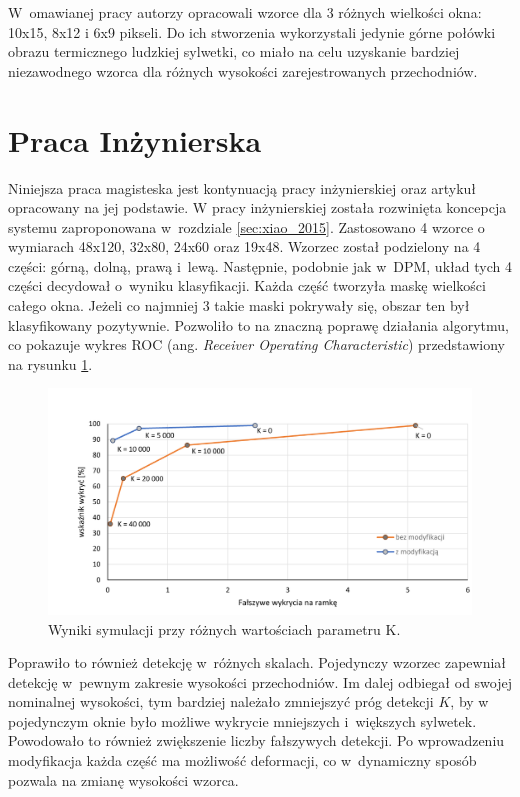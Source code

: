 W~omawianej pracy autorzy opracowali wzorce dla 3 różnych wielkości okna: 10x15, 8x12 i 6x9 pikseli. 
Do ich stworzenia wykorzystali jedynie górne połówki obrazu termicznego ludzkiej sylwetki, co miało na celu uzyskanie bardziej niezawodnego wzorca dla różnych wysokości zarejestrowanych przechodniów.

\section{Praca Inżynierska}

Niniejsza praca magisteska jest kontynuacją pracy inżynierskiej \cite{kankaing} oraz artykuł opracowany na jej podstawie\cite{kanka2016fpga}. W pracy inżynierskiej została rozwinięta koncepcja systemu zaproponowana w~rozdziale \ref{sec:xiao_2015}. 
Zastosowano 4 wzorce o wymiarach 48x120, 32x80, 24x60 oraz 19x48. 
Wzorzec został podzielony na 4 części: górną, dolną, prawą i~lewą. 
Następnie, podobnie jak w~DPM, układ tych 4 części decydował o~wyniku klasyfikacji. 
Każda część tworzyła maskę wielkości całego okna. 
Jeżeli co najmniej 3 takie maski pokrywały się, obszar ten był klasyfikowany pozytywnie. 
Pozwoliło to na znaczną poprawę działania algorytmu, co pokazuje wykres ROC (ang. \textit{Receiver Operating Characteristic}) przedstawiony na rysunku \ref{fig:analiza_wykres}.
\begin{figure}
\centering
\includegraphics[width=0.8\linewidth]{images/Analiza_wykres}
\caption[Wykres ROC]{Wyniki symulacji przy różnych wartościach parametru K.\cite{kankaing}}
\label{fig:analiza_wykres}
\end{figure}

Poprawiło to również detekcję w~różnych skalach. 
Pojedynczy wzorzec zapewniał detekcję w~pewnym zakresie wysokości przechodniów. 
Im dalej odbiegał od swojej nominalnej wysokości, tym bardziej należało zmniejszyć próg detekcji $K$, by w pojedynczym oknie było możliwe wykrycie mniejszych i~większych sylwetek. %
Powodowało to również zwiększenie liczby fałszywych detekcji. 
Po wprowadzeniu modyfikacja każda część ma możliwość deformacji, co w~dynamiczny sposób pozwala na zmianę wysokości wzorca.

